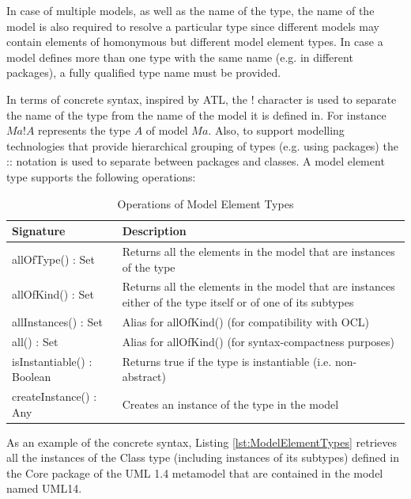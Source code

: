 In case of multiple models, as well as the name of the type, the name of the model is also required to resolve a particular type since different models may contain elements of homonymous but different model element types. In case a model defines more than one type with the same name (e.g. in different packages), a fully qualified type name must be provided.

In terms of concrete syntax, inspired by ATL, the ! character is used to separate the name of the type from the name of the model it is defined in. For instance $Ma!A$ represents the type $A$ of model $Ma$. Also, to support modelling technologies that provide hierarchical grouping of types (e.g. using packages) the :: notation is used to separate between packages and classes.  A model element type supports the following operations:

\begin{longtabu} {|p{6.5cm}|X|}
			
			\caption{Operations of Model Element Types}
			\label{tab:ModelElementTypesOperations}\\
			
			\hline
			
			\textbf{Signature} & \textbf{Description} \\\hline
			
			allOfType() : Set & Returns all the elements in the model that are instances of the type \\\hline
			
			allOfKind() : Set & Returns all the elements in the model that are instances either of the type itself or of one of its subtypes  \\\hline

			allInstances() : Set & Alias for allOfKind() (for compatibility with OCL) \\\hline
						
			all() : Set & Alias for allOfKind() (for syntax-compactness purposes) \\\hline
			
			isInstantiable() : Boolean & Returns true if the type is instantiable (i.e. non-abstract)  \\\hline
			
			createInstance() : Any & Creates an instance of the type in the model \\\hline
			
\end{longtabu}

As an example of the concrete syntax, Listing \ref{lst:ModelElementTypes} retrieves all the instances of the Class type (including instances of its subtypes) defined in the Core package of the UML 1.4 metamodel that are contained in the model named UML14.

